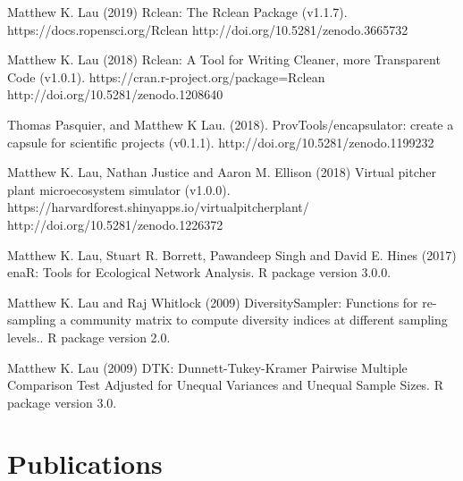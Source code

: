 \documentclass[a4paper]{article}
\begin{document}

{Matthew K. Lau (2019) Rclean: The Rclean Package
  (v1.1.7). https://docs.ropensci.org/Rclean
  http://doi.org/10.5281/zenodo.3665732}

{Matthew K. Lau (2018) Rclean: A Tool for Writing Cleaner, more
  Transparent Code (v1.0.1). https://cran.r-project.org/package=Rclean
  http://doi.org/10.5281/zenodo.1208640}

{Thomas Pasquier, and Matthew K Lau. (2018). ProvTools/encapsulator:
  create a capsule for scientific projects
  (v0.1.1). http://doi.org/10.5281/zenodo.1199232}

{Matthew K. Lau, Nathan Justice and Aaron M. Ellison (2018) Virtual
  pitcher plant microecosystem simulator
  (v1.0.0). https://harvardforest.shinyapps.io/virtualpitcherplant/
  http://doi.org/10.5281/zenodo.1226372}

{Matthew K. Lau, Stuart R. Borrett, Pawandeep Singh and David E. Hines
  (2017) enaR: Tools for Ecological Network Analysis. R package
  version 3.0.0.}

{Matthew K. Lau and Raj Whitlock (2009) DiversitySampler: Functions
  for re-sampling a community matrix to compute diversity indices at
  different sampling levels.. R package version 2.0.}

{Matthew K. Lau (2009) DTK: Dunnett-Tukey-Kramer Pairwise Multiple
Comparison Test Adjusted for Unequal Variances and Unequal Sample Sizes.
R package version 3.0.}

\section{Publications}\label{publications}
\end{document}
